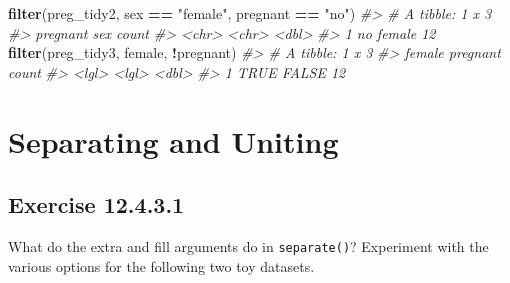 \documentclass[]{book}
\newenvironment{Shaded}{\begin{snugshade}}{\end{snugshade}}
\newcommand{\CommentTok}[1]{\textcolor[rgb]{0.56,0.35,0.01}{\textit{#1}}}
\newcommand{\DataTypeTok}[1]{\textcolor[rgb]{0.13,0.29,0.53}{#1}}
\newcommand{\KeywordTok}[1]{\textcolor[rgb]{0.13,0.29,0.53}{\textbf{#1}}}
\newcommand{\NormalTok}[1]{#1}
\newcommand{\OperatorTok}[1]{\textcolor[rgb]{0.81,0.36,0.00}{\textbf{#1}}}
\newcommand{\StringTok}[1]{\textcolor[rgb]{0.31,0.60,0.02}{#1}}
\theoremstyle{plain}
\theoremstyle{remark}
\begin{document}
\begin{Shaded}
\begin{Highlighting}[]
\KeywordTok{filter}\NormalTok{(preg_tidy2, sex }\OperatorTok{==}\StringTok{ "female"}\NormalTok{, pregnant }\OperatorTok{==}\StringTok{ "no"}\NormalTok{)}
\CommentTok{#> # A tibble: 1 x 3}
\CommentTok{#>   pregnant sex    count}
\CommentTok{#>   <chr>    <chr>  <dbl>}
\CommentTok{#> 1 no       female    12}
\KeywordTok{filter}\NormalTok{(preg_tidy3, female, }\OperatorTok{!}\NormalTok{pregnant)}
\CommentTok{#> # A tibble: 1 x 3}
\CommentTok{#>   female pregnant count}
\CommentTok{#>   <lgl>  <lgl>    <dbl>}
\CommentTok{#> 1 TRUE   FALSE       12}
\end{Highlighting}
\end{Shaded}

\hypertarget{separating-and-uniting}{%
\section{Separating and Uniting}\label{separating-and-uniting}}

\hypertarget{exercise-12.4.3.1}{%
\subsection*{\texorpdfstring{Exercise
{12.4.3.1}}{Exercise 12.4.3.1}}\label{exercise-12.4.3.1}}

What do the extra and fill arguments do in \texttt{separate()}?
Experiment with the various options for the following two toy datasets.

\begin{Shaded}
\end{Shaded}
\end{document}

